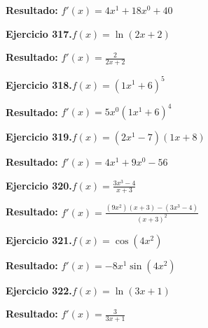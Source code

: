 \documentclass[10pt,a4paper]{article}
\begin{document}
\begin{solbox}
\textbf{Resultado:} \(\displaystyle f'(x) = 4x^{1} +18x^{0} +40\)
\end{solbox}

\begin{ejbox}
\textbf{Ejercicio 317.}\quad $f(x) = \ln(2x + 2)$
\end{ejbox}

\begin{solbox}
\textbf{Resultado:} \(\displaystyle f'(x) = \frac{2}{2x + 2}\)
\end{solbox}

\begin{ejbox}
\textbf{Ejercicio 318.}\quad $f(x) = (1x^{1} +6)^{5}$
\end{ejbox}

\begin{solbox}
\textbf{Resultado:} \(\displaystyle f'(x) = 5x^{0}(1x^{1} +6)^{4}\)
\end{solbox}

\newpage
\begin{ejbox}
\textbf{Ejercicio 319.}\quad $f(x) = (2x^{1} -7)(1x +8)$
\end{ejbox}

\begin{solbox}
\textbf{Resultado:} \(\displaystyle f'(x) = 4x^{1} +9x^{0} -56\)
\end{solbox}

\begin{ejbox}
\textbf{Ejercicio 320.}\quad $f(x) = \frac{3x^{3} -4}{x + 3}$
\end{ejbox}

\begin{solbox}
\textbf{Resultado:} \(\displaystyle f'(x) = \frac{(9x^{2})(x+3) - (3x^{3} -4)}{(x+3)^2}\)
\end{solbox}

\begin{ejbox}
\textbf{Ejercicio 321.}\quad $f(x) = \cos(4x^{2})$
\end{ejbox}

\begin{solbox}
\textbf{Resultado:} \(\displaystyle f'(x) = -8x^{1}\sin(4x^{2})\)
\end{solbox}

\newpage
\begin{ejbox}
\textbf{Ejercicio 322.}\quad $f(x) = \ln(3x + 1)$
\end{ejbox}

\begin{solbox}
\textbf{Resultado:} \(\displaystyle f'(x) = \frac{3}{3x + 1}\)
\end{solbox}
\end{document}
